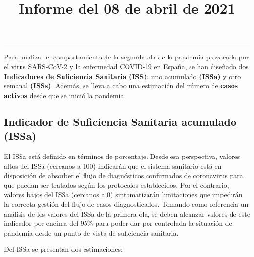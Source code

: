 \documentclass[
  11pt,
]{article}
\title{Informe del 08 de abril de 2021}
\author{}
\date{\vspace{-2.5em}}
\begin{document}
\maketitle

\renewcommand{\figurename}{Figura}
\renewcommand{\tablename}{Tabla}

\tableofcontents

\vspace{.5cm}

\begin{center}\rule{0.5\linewidth}{0.5pt}\end{center}

\vspace{.5cm}

Para analizar el comportamiento de la segunda ola de la pandemia
provocada por el virus SARS-CoV-2 y la enfermedad COVID-19 en España, se
han diseñado dos \textbf{Indicadores de Suficiencia Sanitaria (ISS):}
uno acumulado \textbf{(ISSa)} y otro semanal \textbf{(ISSs)}. Además, se
lleva a cabo una estimación del número de \textbf{casos activos} desde
que se inició la pandemia.

\hypertarget{indicador-de-suficiencia-sanitaria-acumulado-issa}{%
\subsection{Indicador de Suficiencia Sanitaria acumulado
(ISSa)}\label{indicador-de-suficiencia-sanitaria-acumulado-issa}}

El ISSa está definido en términos de porcentaje. Desde esa perspectiva,
valores altos del ISSa (cercanos a 100) indicarán que el sistema
sanitario está en disposición de absorber el flujo de diagnósticos
confirmados de coronavirus para que puedan ser tratados según los
protocolos establecidos. Por el contrario, valores bajos del ISSa
(cercanos a 0) sintomatizarán limitaciones que impedirán la correcta
gestión del flujo de casos diagnosticados. Tomando como referencia un
análisis de los valores del ISSa de la primera ola, se deben alcanzar
valores de este indicador por encima del 95\% para poder dar por
controlada la situación de pandemia desde un punto de vista de
suficiencia sanitaria.

Del ISSa se presentan dos estimaciones:
\end{document}
